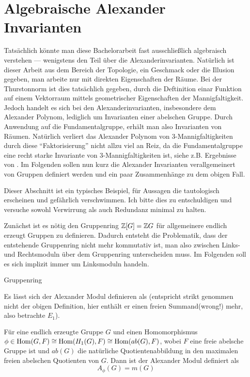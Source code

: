 
\section{Algebraische Alexander Invarianten}

Tatsächlich könnte man diese Bachelorarbeit fast ausschließlich algebraisch verstehen --- wenigstens den Teil über die Alexanderinvarianten. Natürlich ist dieser Arbeit aus dem Bereich der Topologie, ein Geschmack oder die Illusion gegeben, man arbeite nur mit direkten Eigenschaften der Räume. Bei der Thurstonnorm ist dies tatsächlich gegeben, durch die Deftinition einar Funktion auf einem Vektorraum mittels geometrischer Eigenschaften der Mannigfaltigkeit. Jedoch handelt es sich bei den Alexanderinvarianten, insbesondere dem Alexander Polynom, lediglich um Invarianten einer abelschen Gruppe. Durch Anwendung auf die Fundamentalgruppe, erhält man also Invarianten von Räumen. Natürlich verliert das Alexander Polynom von 3-Mannigfaltigkeiten durch diese "`Faktorisierung"' nicht allzu viel an Reiz, da die Fundamentalgruppe eine recht starke Invariante von 3-Mannigfaltigkeiten ist, siehe z.B. Ergebnisse von  . Im Folgenden sollen nun kurz die Alexander Invarianten verallgemeinert von Gruppen definiert werden und ein paar Zusammenhänge zu dem obigen Fall.

Dieser Abschnitt ist ein typisches Beispiel, für Aussagen die tautologisch erscheinen und gefährlich verschwimmen. Ich bitte dies zu entschuldigen und versuche sowohl Verwirrung als auch Redundanz minimal zu halten.

Zunächst ist es nötig den Gruppenring $\mathbb{Z}[G]=\mathbb{Z} G$ für allgemeinere endlich erzeugt Gruppen zu definieren. Dadurch entsteht die Problematik, dass der entstehende Gruppenring nicht mehr kommutativ ist, man also zwischen Links- und Rechtsmoduln über dem Gruppenring unterscheiden muss. Im Folgenden soll es sich implizit immer um Linksmoduln handeln.
\begin{defn}
	Gruppenring
\end{defn}

Es lässt sich der Alexander Modul definieren als (entspricht strikt genommen nicht der obigen Definition, hier enthält er einen freien Summand(wrong!) mehr, also betrachte $E_1$).

\begin{defn}
	Für eine endlich erzeugte Gruppe $G$ und einen Homomorphismus $\phi \in \operatorname{Hom}(G,F) \cong \operatorname{Hom}(H_1(G),F) \cong \operatorname{Hom}(ab(G),F)$, wobei $F$ eine freie abelsche Gruppe ist und $ab(G)$ die natürliche Quotientenabbildung in den maximalen freien abelschen Quotienten von $G$. Dann ist der Alexander Modul definiert als
	\[
		A_\phi(G)=m(G)
	\]
\end{defn}

